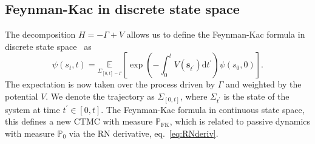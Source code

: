 \subsection{Feynman-Kac in discrete state space}
The decomposition $H = -\Gamma + V$ allows us to define the Feynman-Kac formula in discrete state space~\cite{rogers2000diffusions} as
\begin{equation}
	\label{eq:fkac_disc}
	\psi\left(s_t, t\right)=
	\underset{\Sigma_{[0, t] \sim \Gamma}}{\mathbb{E}}
	\left[
	\exp \left(-\int_{0}^{t} V\left(\boldsymbol{s}_{t^{\prime}}\right) \mathrm{d} t^{\prime}\right) \psi\left(s_0, 0\right)
	\right].
\end{equation}
The expectation is now taken over the process driven by $\Gamma$ and weighted by the potential $V$. We denote the trajectory as $\Sigma_{[0, t]}$, where $\Sigma_{t^\prime}$ is the state of the system at time $t^\prime \in [0, t]$. The Feynman-Kac formula in continuous state space, this defines a new CTMC with measure $\mathbb{P}_{\text{FK}}$, which is related to  passive dynamics with measure $\mathbb{P}_0$ via the RN derivative, eq.~\eqref{eq:RNderiv}.

